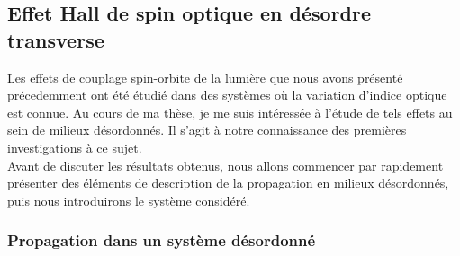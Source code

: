 \documentclass[a4paper,11pt]{article} %
\begin{document}
	
	\subsection{Effet Hall de spin optique en désordre transverse}
	Les effets de couplage spin-orbite de la lumière que nous avons présenté précedemment ont été étudié dans des systèmes où la variation d'indice optique est connue. Au cours de ma thèse, je me suis intéressée à l'étude de tels effets au sein de milieux désordonnés. Il s'agit à notre connaissance des premières investigations à ce sujet.\\
	Avant de discuter les résultats obtenus, nous allons commencer par rapidement présenter des éléments de description de la propagation en milieux désordonnés, puis nous introduirons le système considéré.
	
	\subsubsection{Propagation dans un système désordonné}
	
\end{document}
